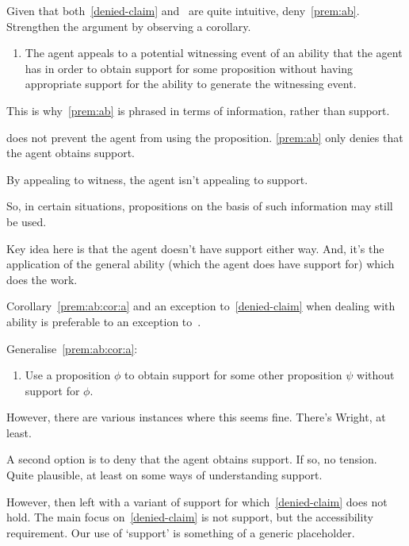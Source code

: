 \begin{note}
Given that both~\ref{denied-claim} and~\nI{} are quite intuitive, deny~\ref{prem:ab}.
Strengthen the argument by observing a corollary.

\begin{enumerate}
\item\label{prem:ab:cor:a} The agent appeals to a potential witnessing event of an ability that the agent has in order to obtain support for some proposition without having appropriate support for the ability to generate the witnessing event.
\end{enumerate}

This is why~\ref{prem:ab} is phrased in terms of information, rather than support.

\nI{} does not prevent the agent from using the proposition.
\ref{prem:ab} only denies that the agent obtains support.

By appealing to witness, the agent isn't appealing to support.

So, in certain situations, propositions on the basis of such information may still be used.

Key idea here is that the agent doesn't have support either way.
And, it's the application of the general ability (which the agent does have support for) which does the work.

Corollary~\ref{prem:ab:cor:a} and an exception to~\ref{denied-claim} when dealing with ability is preferable to an exception to~\nI{}.
\end{note}

\begin{note}
  Generalise~\ref{prem:ab:cor:a}:
  \begin{enumerate}
  \item\label{prem:ab:cor:b} Use a proposition \(\phi\) to obtain support for some other proposition \(\psi\) without support for \(\phi\).
  \end{enumerate}
  However, there are various instances where this seems fine.
  There's Wright, at least.
\end{note}

\begin{note}
A second option is to deny that the agent obtains support.
If so, no tension.
Quite plausible, at least on some ways of understanding support.

However, then left with a variant of support for which~\ref{denied-claim} does not hold.
The main focus on~\ref{denied-claim} is not support, but the accessibility requirement.
Our use of `support' is something of a generic placeholder.
\end{note}

